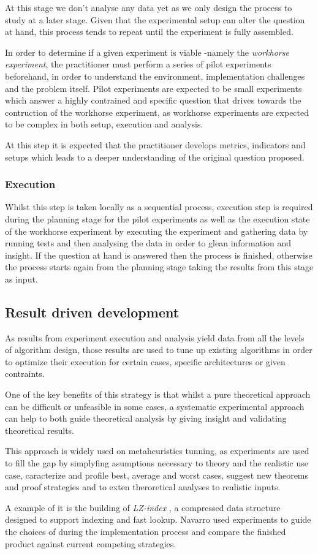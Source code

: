 At this stage we don't analyse any data yet as we only design the process to study at a later stage. Given that the experimental setup can alter the question at hand, this process tends to repeat until the experiment is fully assembled.

In order to determine if a given experiment is viable -namely the \textit{workhorse experiment}, the practitioner must perform a series of pilot experiments beforehand, in order to understand the environment, implementation challenges and the problem itself. Pilot experiments are expected to be small experiments which answer a highly contrained and specific question that drives towards the contruction of the workhorse experiment, as workhorse experiments are expected to be complex in both setup, execution and analysis.

At this step it is expected that the practitioner develops metrics, indicators and setups which leads to a deeper understanding of the original question proposed.

\subsubsection{Execution}
Whilst this step is taken locally as a sequential process, execution step is required during the planning stage for the pilot experiments as well as the execution state of the workhorse experiment by executing the experiment and gathering data by running tests and then analysing the data in order to glean information and insight. If the question at hand is answered then the process is finished, otherwise the process starts again from the planning stage taking the results from this stage as input.

\subsection{Result driven development}
As results from experiment execution and analysis yield data from all the levels of algorithm design, those results are used to tune up existing algorithms in order to optimize their execution for certain cases, specific architectures or given contraints.

One of the key benefits of this strategy is that whilst a pure theoretical approach can be difficult or unfeasible in some cases, a systematic experimental approach can help to both guide theoretical analysis by giving insight and validating theoretical results.

This approach is widely used on metaheuristics tunning, as experiments are used to fill the gap by simplyfing asumptions necessary to theory and the realistic use case, caracterize and profile best, average and worst cases, suggest new theorems and proof strategies and to exten theroretical analyses to realistic inputs.

A example of it is the building of \textit{LZ-index} \cite{Navarro_2009}, a compressed data structure designed to support indexing and fast lookup. Navarro used experiments to guide the choices of during the implementation process and compare the finished product against current competing strategies.